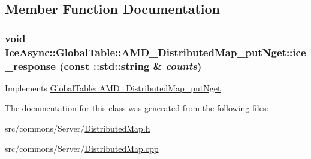 \subsection{Member Function Documentation}
\hypertarget{class_ice_async_1_1_global_table_1_1_a_m_d___distributed_map__put_nget_ac8be69737e1c3604a144dbdeb6653b8d}{
\subsubsection[{ice\_\-response}]{\setlength{\rightskip}{0pt plus 5cm}void IceAsync::GlobalTable::AMD\_\-DistributedMap\_\-putNget::ice\_\-response (const ::std::string \& {\em counts})}}
\label{class_ice_async_1_1_global_table_1_1_a_m_d___distributed_map__put_nget_ac8be69737e1c3604a144dbdeb6653b8d}


Implements \hyperlink{class_global_table_1_1_a_m_d___distributed_map__put_nget_a502958a18fdd4eceabd8fb92d42e676d}{GlobalTable::AMD\_\-DistributedMap\_\-putNget}.



The documentation for this class was generated from the following files:\begin{DoxyCompactItemize}
\item 
src/commons/Server/\hyperlink{_distributed_map_8h}{DistributedMap.h}\item 
src/commons/Server/\hyperlink{_distributed_map_8cpp}{DistributedMap.cpp}\end{DoxyCompactItemize}
